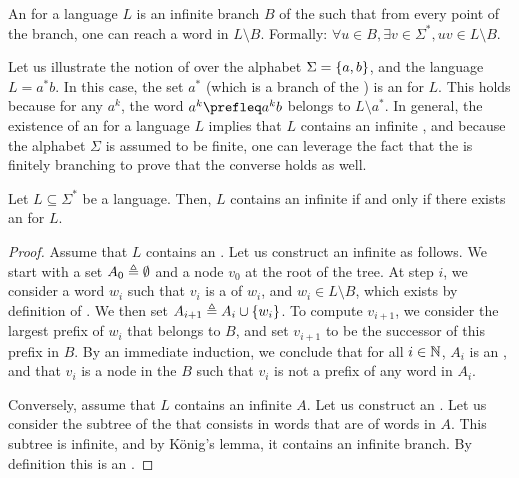 \begin{definition}
    An  for a language $L$ is an infinite 
    branch $B$ of the  such that from every point of the branch, 
    one can reach a word in $L \setminus B$. Formally:
    $\forall u \in B, \exists v \in \Sigma^*, uv \in L \setminus B$.
\end{definition}

Let us illustrate the notion of  over the alphabet $\Sigma
= \{ a,b \}$, and the language $L = a^* b$. In this case, the set $a^*$ (which
is a branch of the ) is an  for $L$.
This holds because for any $a^k$, the word $a^k \prefleq a^kb$ belongs to $L
\setminus a^*$. In general, the existence of an  for a
language $L$ implies that $L$ contains an infinite , and because
the alphabet $\Sigma$ is assumed to be finite, one can leverage the fact that
the  is finitely branching to prove that the converse
holds as well.

\begin{lemma}
    \label{antichain-branches-prefix:lem}
    Let $L \subseteq \Sigma^*$ be a language. Then, $L$ contains an infinite
     if and only if there exists an  for $L$.
\end{lemma}
\begin{proof}
    Assume that $L$ contains an . Let us construct an
    infinite  as follows. We start with a set $A_0 \triangleq
    \emptyset$ and a node $v_0$ at the root of the tree. At step $i$, we
    consider a word $w_i$ such that $v_i$ is a  of $w_i$, and $w_i
    \in L \setminus B$, which exists by definition of .
    We then set $A_{i+1} \triangleq A_i \cup \{ w_i \}$. To compute $v_{i+1}$, we
    consider the largest prefix of $w_i$ that belongs to $B$, and set $v_{i+1}$
    to be the successor of this prefix in $B$. By an immediate induction, we
    conclude that for all $i \in \mathbb{N}$, $A_i$ is an , and that
    $v_i$ is a node in the  $B$ such that $v_i$ is not a
    prefix of any word in $A_i$. 

    Conversely, assume that $L$ contains an infinite  $A$. Let us
    construct an . Let us consider the subtree of the
     that consists in words that are  of
    words in $A$. This subtree is infinite, and by König's lemma, it contains
    an infinite branch. By definition this is an .
\end{proof}

